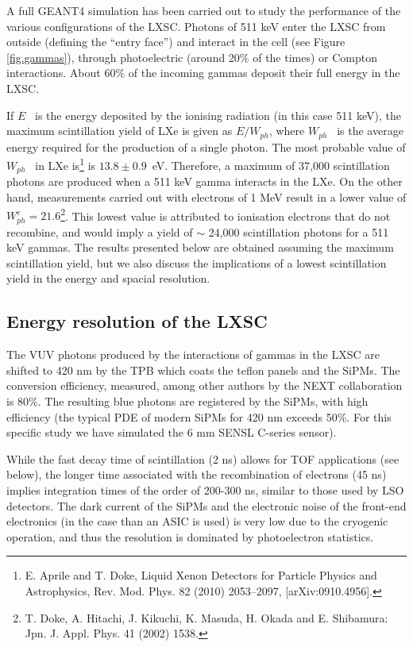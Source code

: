 \documentclass[a4paper,11pt,oneside]{article}
\begin{document}
A full GEANT4 simulation has been carried out to study the performance of the various configurations of the LXSC. Photons of 511 keV enter the LXSC from outside (defining the ``entry face'') and interact in the cell (see Figure \ref{fig.gammas}), through photoelectric (around 20\% of the times) or Compton interactions. About 60\% of the incoming gammas deposit their full energy in the LXSC. 

If $E$~ is the energy deposited by the ionising radiation (in this case 511 keV), the maximum scintillation yield of LXe is given as $E/W_{ph}$, where $W_{ph}$~ is the average energy required for the production of a single photon. The most probable value of $W_{ph}$~ in LXe  is\footnote{E. Aprile and T. Doke, Liquid Xenon Detectors for Particle Physics and Astrophysics, Rev. Mod. Phys. 82 (2010) 2053–2097, [arXiv:0910.4956].} is $13.8 \pm 0.9$~eV. Therefore, a maximum of 37,000 scintillation photons are produced when a 511 keV gamma interacts in the LXe. On the other hand, measurements carried out with electrons of 1 MeV result in a lower value of $W_{ph}^e = 21.6$\footnote{T. Doke, A. Hitachi, J. Kikuchi, K. Masuda, H. Okada and E. Shibamura: Jpn. J. Appl. Phys. 41 (2002) 1538.}. This lowest value is attributed to ionisation electrons that do not recombine, and would imply a yield of $\sim$ 24,000 scintillation photons for a 511 keV gammas. The results presented below are obtained assuming the maximum scintillation yield, but we also discuss the implications of a lowest scintillation yield in the energy and spacial resolution. 

\subsection{Energy resolution of the LXSC}

The VUV photons produced by the interactions of gammas in the LXSC are shifted to 420 nm by the TPB which coats the teflon panels and the SiPMs. The conversion efficiency, measured, among other authors by the NEXT collaboration is 80\%. The resulting blue photons are registered by the SiPMs, with high efficiency (the typical PDE of modern SiPMs for 420 nm exceeds 50\%. For this specific study we have simulated the 6 mm SENSL C-series sensor). 

While the fast decay time of scintillation (2 ns) allows for TOF applications (see below), the longer time associated with the recombination of electrons (45 ns) implies integration times of the order of 200-300 ns, similar to those used by LSO detectors. The dark current of the SiPMs and the electronic noise of the front-end electronics (in the case than an ASIC is used) is very low due to the cryogenic operation, and thus the resolution is dominated by photoelectron statistics. 
\end{document}

